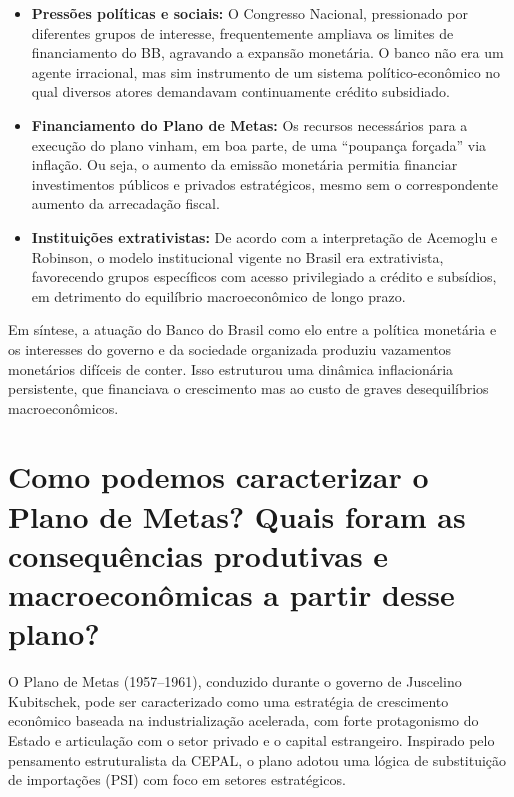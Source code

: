\documentclass{sciposter}
\begin{document}
\begin{multicols}{3}
\begin{itemize}
    \item \textbf{Pressões políticas e sociais:} O Congresso Nacional, pressionado por diferentes grupos de interesse, frequentemente ampliava os limites de financiamento do BB, agravando a expansão monetária. O banco não era um agente irracional, mas sim instrumento de um sistema político-econômico no qual diversos atores demandavam continuamente crédito subsidiado.

    \item \textbf{Financiamento do Plano de Metas:} Os recursos necessários para a execução do plano vinham, em boa parte, de uma ``poupança forçada'' via inflação. Ou seja, o aumento da emissão monetária permitia financiar investimentos públicos e privados estratégicos, mesmo sem o correspondente aumento da arrecadação fiscal.

    \item \textbf{Instituições extrativistas:} De acordo com a interpretação de Acemoglu e Robinson, o modelo institucional vigente no Brasil era extrativista, favorecendo grupos específicos com acesso privilegiado a crédito e subsídios, em detrimento do equilíbrio macroeconômico de longo prazo.
\end{itemize}

Em síntese, a atuação do Banco do Brasil como elo entre a política monetária e os interesses do governo e da sociedade organizada produziu vazamentos monetários difíceis de conter. Isso estruturou uma dinâmica inflacionária persistente, que financiava o crescimento mas ao custo de graves desequilíbrios macroeconômicos.

\section{\textbf{Como podemos caracterizar o Plano de Metas? Quais foram as consequências produtivas e macroeconômicas a partir desse plano?}}

O Plano de Metas (1957--1961), conduzido durante o governo de Juscelino Kubitschek, pode ser caracterizado como uma estratégia de crescimento econômico baseada na industrialização acelerada, com forte protagonismo do Estado e articulação com o setor privado e o capital estrangeiro. Inspirado pelo pensamento estruturalista da CEPAL, o plano adotou uma lógica de substituição de importações (PSI) com foco em setores estratégicos.


\end{multicols}
\end{document}
